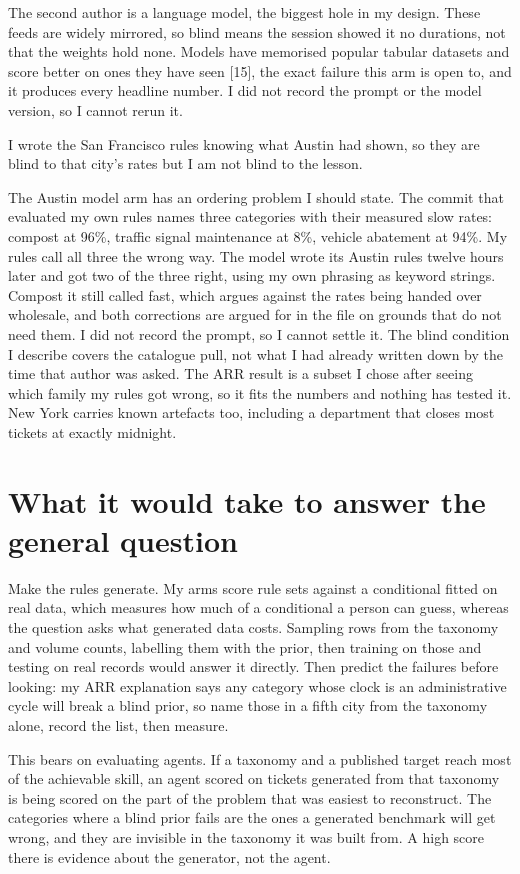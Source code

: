 \documentclass[10pt,a4paper,twocolumn]{article}
\begin{document}
The second author is a language model, the biggest hole in my design. These feeds are
widely mirrored, so blind means the session showed it no durations, not that the
weights hold none. Models have
memorised popular tabular datasets and score better on ones they have seen [15],
the exact failure this arm is open to, and it produces every headline number. I
did not record the prompt or the model version, so I cannot rerun it.

I wrote the San Francisco rules knowing what Austin had shown, so they are blind
to that city's rates but I am not blind to the lesson.

The Austin model arm has an ordering problem I should state. The commit that
evaluated my own rules names three categories with their measured slow rates:
compost at 96\%, traffic signal maintenance at 8\%, vehicle abatement at 94\%. My
rules call all three the wrong way. The model wrote its Austin rules twelve hours
later and got two of the three right, using my own phrasing as keyword strings.
Compost it still called fast, which argues against the rates being handed over
wholesale, and both corrections are argued for in the file on grounds that do not
need them. I did not record the prompt, so I cannot settle it. The blind
condition I describe covers the catalogue pull, not what I had already written
down by the time that author was asked. The ARR result is a subset
I chose after seeing which family my rules got wrong, so it fits the numbers and
nothing has tested it. New York carries known artefacts too, including a
department that closes most tickets at exactly midnight.

\section*{What it would take to answer the general question}

Make the rules generate. My arms score rule sets against a conditional fitted on
real data, which measures how much of a conditional a person can guess, whereas
the question asks what generated data costs. Sampling rows from the taxonomy and
volume counts, labelling them with the prior, then training on those and testing
on real records would answer it directly. Then predict the failures before
looking: my ARR explanation says any category whose clock is an administrative
cycle will break a blind prior, so name those in a fifth city from the taxonomy
alone, record the list, then measure.

This bears on evaluating agents. If a taxonomy and a published target reach most
of the achievable skill, an agent scored on tickets generated from that taxonomy
is being scored on the part of the problem that was easiest to reconstruct. The
categories where a blind prior fails are the ones a generated benchmark will get
wrong, and they are invisible in the taxonomy it was built from. A high score
there is evidence about the generator, not the agent.
\end{document}
